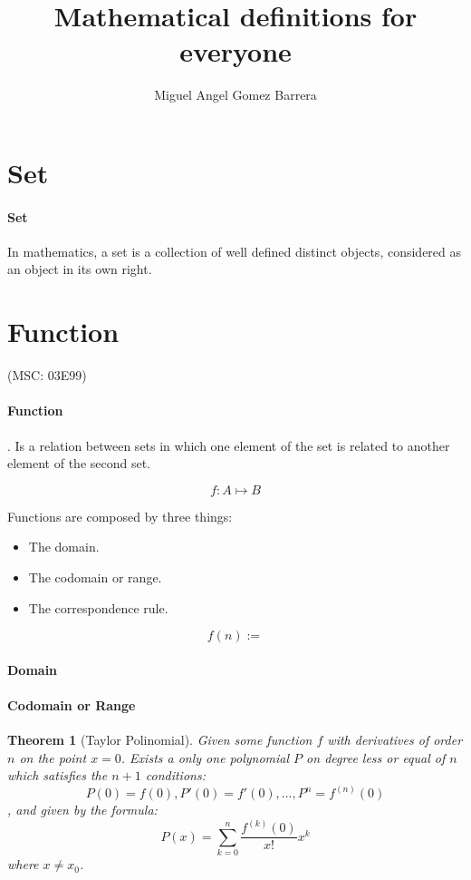 \documentclass{article}
\newtheorem{theorem}{Theorem}[section]
\begin{document}
\title{Mathematical definitions for everyone}
\author{Miguel Angel Gomez Barrera}

\maketitle

\section{Set}

\paragraph{Set} In mathematics, a set is a collection of well defined distinct objects, considered as an object in its own right.

\section{Function}
(MSC: 03E99)
\paragraph{Function} . Is a relation between sets in which one element of the set is related to another element of the second set.

$$f: A \mapsto B$$

Functions are composed by three things:

\begin{itemize}
    \item The domain.
    \item The codomain or range.
    \item The correspondence rule.
\end{itemize}

$$f(n):=$$

\paragraph{Domain}
\paragraph{Codomain or Range}

\begin{theorem}[Taylor Polinomial] Given some function $f$ with derivatives of order $n$ on the point $x=0$. Exists a only one polynomial $P$ on degree less or equal of $n$ which satisfies the $n + 1$ conditions:
	$$P(0) = f(0), P'(0)=f'(0), \dots, P^n = f^{(n)}(0)$$
, and given by the formula:
	$$P(x) = \sum_{k=0}^{n} \frac{f^{(k)}(0)}{x!}x^{k}$$
where $x \neq x_0$.
\end{theorem}
\end{document}
